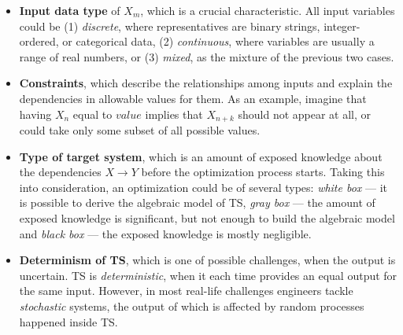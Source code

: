 \begin{itemize}
	\item \textbf{Input data type} of $X_m$, which is a crucial characteristic. All input variables could be (1) \emph{discrete}, where representatives are binary strings, integer-ordered, or categorical data, (2) \emph{continuous}, where variables are usually a range of real numbers, or (3) \emph{mixed}, as the mixture of the previous two cases.

	\item \textbf{Constraints}, which describe the relationships among inputs and explain the dependencies in allowable values for them. As an example, imagine that having $X_n$ equal to $value$ implies that $X_{n + k}$ should not appear at all, or could take only some subset of all possible values.
	
	\item \textbf{Type of target system}, which is an amount of exposed knowledge about the dependencies $X \rightarrow Y$ before the optimization process starts. Taking this into consideration, an optimization could be of several types: \emph{white box} — it is possible to derive the algebraic model of TS, \emph{gray box} — the amount of exposed knowledge is significant, but not enough to build the algebraic model and \emph{black box} — the exposed knowledge is mostly negligible.


	\item \textbf{Determinism of TS}, which is one of possible challenges, when the output is uncertain. TS is \emph{deterministic}, when it each time provides an equal output for the same input. However, in most real-life challenges engineers tackle \emph{stochastic} systems, the output of which is affected by random processes happened inside TS.


\end{itemize}
